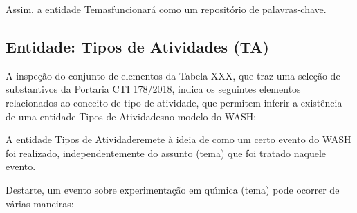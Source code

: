\documentclass[
12pt,		%
openright,	%
twoside,  %
a4paper,			%
chapter=TITLE,		%
english,			%
french,				%
spanish,			%
brazil				%
]{USPSC-classe/USPSC}
\begin{document}
Assim, a entidade \textquotedbl Temas\textquotedbl  funcionar\'a como um reposit\'orio de palavras-chave.









\subsection[Entidade: Tipos de Atividades (TA)]{Entidade: Tipos de Atividades (TA)}\label{Entidade: Tipos de Atividades (TA)}
A inspe\c{c}\~ao do conjunto de elementos da Tabela XXX, que traz uma sele\c{c}\~ao de substantivos da Portaria CTI 178/2018, indica os seguintes elementos relacionados ao conceito de \textquotedbl tipo de atividade\textquotedbl , que permitem inferir a exist\^encia de uma entidade \textquotedbl Tipos de Atividades\textquotedbl  no modelo do WASH:










\noindent\begin{center}\mbox{\centering{}}\end{center}


A entidade \textquotedbl Tipos de Atividade\textquotedbl  remete \`a ideia de como um certo evento do WASH foi realizado, independentemente do assunto (tema) que foi tratado naquele evento.









Destarte, um evento sobre experimenta\c{c}\~ao em qu\'{\i}mica (tema) pode ocorrer de v\'arias maneiras:
\end{document}
